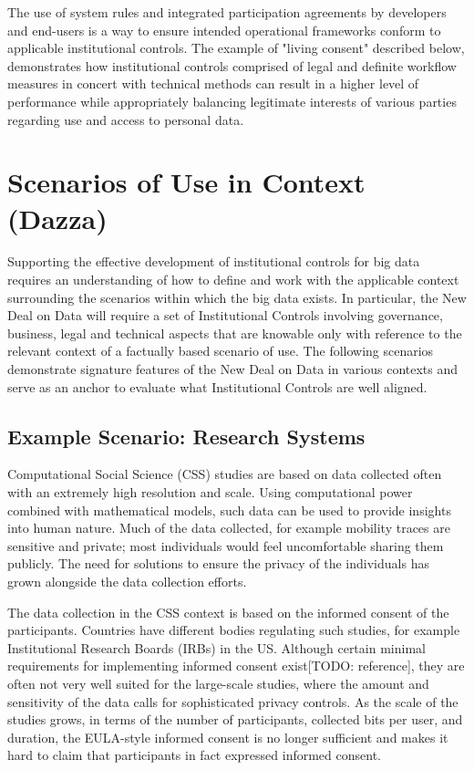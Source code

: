 The use of system rules and integrated participation agreements by developers and end-users is a way to ensure intended operational frameworks conform to applicable institutional controls.
The example of "living consent" described below, demonstrates how institutional controls comprised of legal and definite workflow measures in concert with technical methods can result in a higher level of performance while appropriately balancing legitimate interests of various parties regarding use and access to personal data.

\section{Scenarios of Use in Context (Dazza)}

Supporting the effective development of institutional controls for big data requires an understanding of how to define and work with the applicable context surrounding the scenarios within which the big data exists. In particular, the New Deal on Data will require a set of Institutional Controls involving governance, business, legal and technical aspects that are knowable only with reference to the relevant context of a factually based scenario of use. The following scenarios demonstrate signature features of the New Deal on Data in various contexts and serve as an anchor to evaluate what Institutional Controls are well aligned.

\subsection{Example Scenario: Research Systems}

Computational Social Science (CSS) studies are based on data collected often with an extremely high resolution and scale. Using computational power combined with mathematical models, such data can be used to provide insights into human nature. Much of the data collected, for example mobility traces are sensitive and private; most individuals would feel uncomfortable sharing them publicly. The need for solutions to ensure the privacy of the individuals has grown alongside the data collection efforts.

The data collection in the CSS context is based on the informed consent of the participants. Countries have different bodies regulating such studies, for example Institutional Research Boards (IRBs) in the US. Although certain minimal requirements for implementing informed consent exist[TODO: reference], they are often not very well suited for the large-scale studies, where the amount and sensitivity of the data calls for sophisticated privacy controls. As the scale of the studies grows, in terms of the number of participants, collected bits per user, and duration, the EULA-style informed consent is no longer sufficient and makes it hard to claim that participants in fact expressed informed consent.

